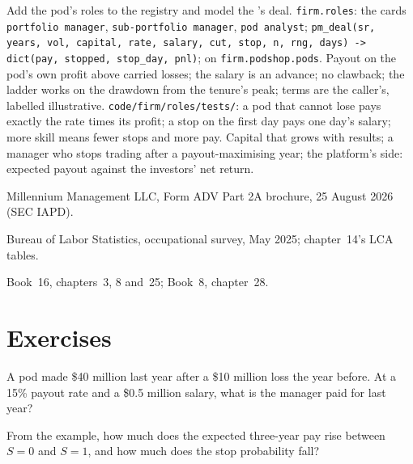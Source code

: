 \begin{build}
 Add the pod's roles to the registry and model the 's deal.
 \texttt{firm.roles}: the cards \texttt{portfolio manager}, \texttt{sub-portfolio manager},
\texttt{pod analyst}; \texttt{pm\_deal(sr, years, vol, capital, rate, salary, cut, stop, n, rng, days) ->
dict(pay, stopped, stop\_day, pnl)}; on \texttt{firm.podshop.pods}.
 Payout on the pod's own profit above carried losses; the salary is an advance; no clawback; the ladder
works on the drawdown from the tenure's peak; terms are the caller's, labelled illustrative.
 \texttt{code/firm/roles/tests/}: a pod that cannot lose pays exactly the rate times its profit;
a stop on the first day pays one day's salary; more skill means fewer stops and more pay.
 Capital that grows with results; a manager who stops trading after a payout-maximising year; the
platform's side: expected payout against the investors' net return.
\end{build}

\begin{omsources}
\item Millennium Management LLC, Form ADV Part 2A brochure, 25 August 2026 (SEC IAPD).
\item Bureau of Labor Statistics, occupational survey, May 2025; chapter~14's LCA tables.
\item Book~16, chapters~3, 8 and~25; Book~8, chapter~28.
\end{omsources}

\section{Exercises}

\begin{exercise}[$\star$]\label{exo:in:portfolio-manager-and-pod-analyst:1}
A pod made \$40 million last year after a \$10 million loss the year before. At a 15\% payout rate and a \$0.5 million
salary, what is the manager paid for last year?
\end{exercise}

\begin{exercise}[$\star$]\label{exo:in:portfolio-manager-and-pod-analyst:2}
From the example, how much does the expected three-year pay rise between $S=0$ and $S=1$, and how much does the stop
probability fall?
\end{exercise}

